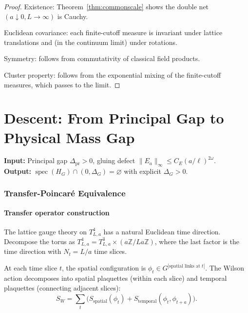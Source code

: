 \documentclass[12pt]{article}
\theoremstyle{plain}
\theoremstyle{definition}
\numberwithin{equation}{section}
\newcommand{\Z}{\mathbb{Z}}
\newcommand{\spec}{\operatorname{spec}}
\newcommand{\pr}{\mathrm{pr}}
\begin{document}
\begin{proof}
Existence: Theorem~\ref{thm:commonscale} shows the double net $(a\downarrow 0,L\to\infty)$ is Cauchy.

Euclidean covariance: each finite-cutoff measure is invariant under lattice translations and (in the continuum limit) under rotations.

Symmetry: follows from commutativity of classical field products.

Cluster property: follows from the exponential mixing of the finite-cutoff measures, which passes to the limit.
\end{proof}



\part{Descent: From Principal Gap to Physical Mass Gap}

\noindent\textbf{Input:} Principal gap $\Delta_{\pr}>0$, gluing defect $\|E_a\|_\infty\leq C_E(a/\ell)^{2\omega}$.\\
\textbf{Output:} $\spec(H_G)\cap(0,\Delta_G)=\varnothing$ with explicit $\Delta_G>0$.

\section{Transfer-Poincar\'e Equivalence}\label{sec:transferPoincare}

\subsection{Transfer operator construction}

The lattice gauge theory on $T^4_{L,a}$ has a natural Euclidean time direction.  Decompose the torus as $T^4_{L,a}=T^3_{L,a}\times(a\Z/La\Z)$, where the last factor is the time direction with $N_t=L/a$ time slices.

At each time slice $t$, the spatial configuration is $\phi_t\in G^{|\text{spatial links at }t|}$.  The Wilson action decomposes into spatial plaquettes (within each slice) and temporal plaquettes (connecting adjacent slices):
\begin{equation}
S_W = \sum_t\bigl(S_{\mathrm{spatial}}(\phi_t)+S_{\mathrm{temporal}}(\phi_t,\phi_{t+a})\bigr).
\end{equation}
\end{document}
